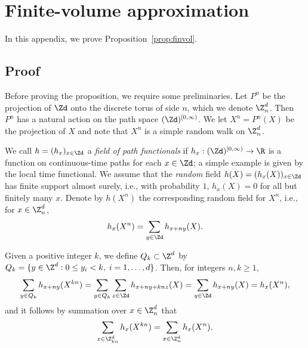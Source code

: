 \chapter{Finite-volume approximation}
\label{sec:finvol}

In this appendix, we prove Proposition~\ref{prop:finvol}.



\section{Proof}

Before proving the proposition, we require some preliminaries.
Let $P^n$ be the projection
of $\Zd$ onto the discrete torus of side $n$,
which we denote $\Z_n^d$.
Then $P^n$ has a natural action
on the path space $(\Zd)^{[0,\infty)}$. We let
$X^n = P^n(X)$ be the projection of $X$
and note that $X^n$ is a simple random walk on $\Z^d_n$.

We call $h = (h_x)_{x\in\Zd}$ a \emph{field of path functionals} if
$h_x : (\Zd)^{[0,\infty)} \to \R$ is a function on continuous-time paths
for each $x \in \Zd$;
a simple example is given by the local time functional.
We assume that the \emph{random} field $h(X) = (h_x(X))_{x\in\Zd}$
has finite support almost surely, i.e.,
with probability $1$, $h_x(X) = 0$ for all but finitely many $x$.
Denote by $h(X^n)$ the corresponding random field for $X^n$, i.e., for $x \in \Z_n^d$,
\begin{equation}
h_x(X^n) = \sum_{y\in\Zd} h_{x+ny}(X).
\end{equation}

Given a positive integer $k$, we define
$Q_k \subset \Z^d$ by $Q_k = \{y \in \Z^d : 0 \le y_i < k, \;   i=1,\ldots,d\}$.
Then, for integers $n,k \ge 1$,
\begin{equation}
\label{e:ffold1}
    \sum_{y \in Q_k} h_{x+ny}(X^{kn})
  = \sum_{y \in Q_k} \sum_{z\in\Zd} h_{x+ny+knz}(X)
  = \sum_{y\in\Zd} h_{x+ny}(X)
  = h_x(X^n),
\end{equation}
and it follows by summation over $x \in \Z^d_n$ that
\begin{equation}
\label{e:ffold2}
\sum_{x\in\Z^d_{kn}} h_x(X^{kn})
  =
\sum_{x\in\Z^d_n} h_x(X^n).
\end{equation}

